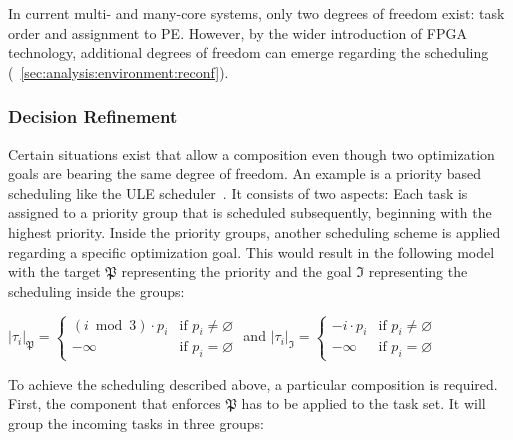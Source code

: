 In current multi- and many-core systems, only two degrees of freedom exist: task order and assignment to \ac{PE}. However, by the wider introduction of \ac{FPGA} technology, additional degrees of freedom can emerge regarding the scheduling (\cf{}~\cref{sec:analysis:environment:reconf}).

\subsubsection{Decision Refinement}%
\label{sec:prop:compo:ability:refinement}

Certain situations exist that allow a composition even though two optimization goals are bearing the same degree of freedom. An example is a priority based scheduling like the ULE scheduler~\cite{Roberson-2003-ULE}. It consists of two aspects: Each task is assigned to a priority group that is scheduled subsequently, beginning with the highest priority. Inside the priority groups, another scheduling scheme is applied regarding a specific optimization goal. This would result in the following model with the target \(\mathfrak{P}\) representing the priority and the goal \(\mathfrak{I}\) representing the scheduling inside the groups:

\begin{center}
	\(|\tau_i|_\mathfrak{P} = \left\{ \begin{array}{ll}
		\displaystyle \left( i \bmod 3 \right) \cdot p_i & \mbox{if } p_i \neq \varnothing \\
		- \infty                                         & \mbox{if } p_i = \varnothing
	\end{array}\right.\)
	\hspace{1cm} and \hspace{1cm}
	\(|\tau_i|_\mathfrak{I} = \left\{ \begin{array}{ll}
		-i \cdot p_i & \mbox{if } p_i \neq \varnothing \\
		- \infty     & \mbox{if } p_i = \varnothing
	\end{array}\right.\)
\end{center}

To achieve the scheduling described above, a particular composition is required. First, the component that enforces \(\mathfrak{P}\) has to be applied to the task set. It will group the incoming tasks in three groups:


